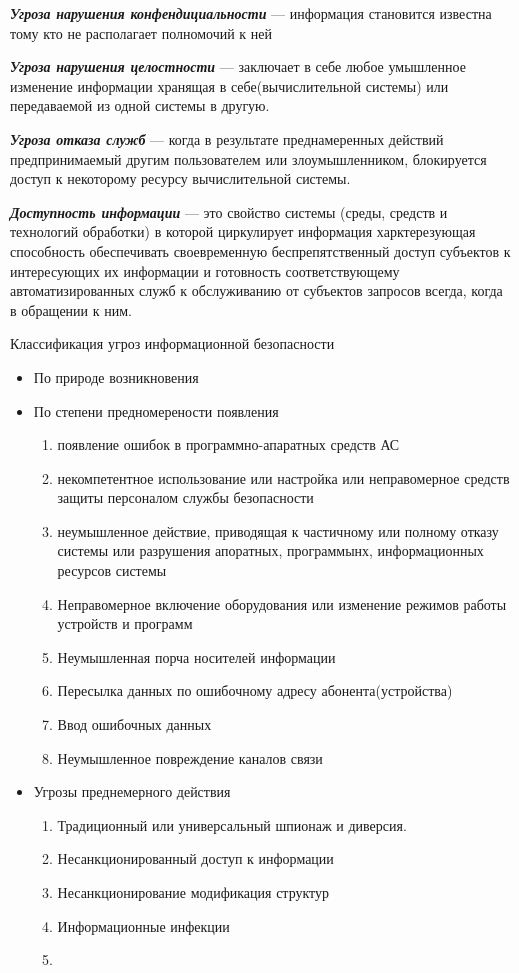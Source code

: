 \documentclass[a4paper,12pt]{extarticle}
\begin{document}
	\textbf{\textit{Угроза нарушения конфендициальности}} --- информация становится известна тому кто не располагает полномочий к ней
	
	\textit{\textbf{Угроза нарушения целостности}} --- заключает в себе любое умышленное изменение информации хранящая в себе(вычислительной системы) или передаваемой из одной системы в другую. 
	
	\textbf{\textit{Угроза отказа служб}} --- когда в результате преднамеренных действий предпринимаемый другим пользователем или злоумышленником, блокируется доступ к некоторому ресурсу вычислительной системы.
	
	\textbf{\textit{Доступность информации}} --- это свойство системы (среды, средств и технологий  обработки) в которой циркулирует информация харктерезующая способность обеспечивать своевременную беспрепятственный доступ субъектов к интересующих их информации и готовность соответствующему автоматизированных служб к обслуживанию от субъектов запросов всегда, когда в обращении к ним.
	
	{\centering Классификация угроз информационной безопасности}
	\begin{itemize}
		\item По природе возникновения 
		\item По степени предномерености появления
		\begin{enumerate}
			\item появление ошибок в программно-апаратных средств АС
			\item некомпетентное использование или настройка или неправомерное средств защиты персоналом службы безопасности
			\item неумышленное действие, приводящая к частичному или полному отказу системы или разрушения апоратных, программынх, информационных ресурсов системы
			\item Неправомерное включение оборудования или изменение режимов работы устройств и программ
			\item Неумышленная порча носителей информации 
			\item Пересылка данных по ошибочному адресу абонента(устройства)
			\item Ввод ошибочных данных
			\item Неумышленное повреждение каналов связи 
		\end{enumerate}
		\item Угрозы преднемерного действия
		\begin{enumerate}
			\item Традиционный или универсальный шпионаж и диверсия.
			\item Несанкционированный доступ к информации 
			\item Несанкционирование модификация структур
			\item Информационные инфекции 
			\item 
		\end{enumerate}
	\end{itemize}
\end{document}
